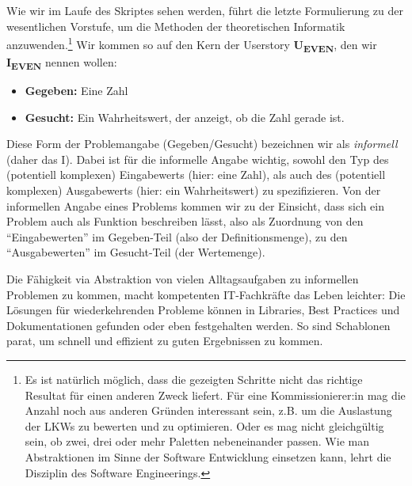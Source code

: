 Wie wir im Laufe des Skriptes sehen werden,
führt die letzte Formulierung zu der wesentlichen Vorstufe,
um die Methoden der theoretischen Informatik anzuwenden.\footnote{
Es ist natürlich möglich,
dass die gezeigten Schritte nicht das richtige Resultat für einen anderen Zweck liefert.
Für eine Kommissionierer:in mag die Anzahl noch aus anderen Gründen interessant sein,
z.B. um die Auslastung der LKWs zu bewerten und zu optimieren.
Oder es mag nicht gleichgültig sein, ob zwei, drei oder mehr Paletten nebeneinander passen.
Wie man Abstraktionen im Sinne der Software Entwicklung einsetzen kann,
lehrt die Disziplin des Software Engineerings.}
Wir kommen so auf den Kern der Userstory \textbf{U\textsubscript{EVEN}},
den wir \textbf{I\textsubscript{EVEN}} nennen wollen:
\begin{itemize}
    \item \textbf{Gegeben:} Eine Zahl
    \item \textbf{Gesucht:} Ein Wahrheitswert, der anzeigt, ob die Zahl gerade ist. 
\end{itemize}
Diese Form der Problemangabe (Gegeben/Gesucht) bezeichnen wir als \emph{informell}
(daher das I).
Dabei ist für die informelle Angabe wichtig,
sowohl den Typ des (potentiell komplexen) Eingabewerts (hier: eine Zahl),
als auch des (potentiell komplexen) Ausgabewerts (hier: ein Wahrheitswert) zu spezifizieren.
Von der informellen Angabe eines Problems kommen wir zu der Einsicht,
dass sich ein Problem auch als Funktion beschreiben lässt,
also als Zuordnung von den ``Eingabewerten'' im Gegeben-Teil
(also der Definitionsmenge),
zu den ``Ausgabewerten'' im Gesucht-Teil
(der Wertemenge).

Die Fähigkeit via Abstraktion von vielen Alltagsaufgaben zu informellen Problemen zu kommen,
macht kompetenten IT-Fachkräfte das Leben leichter:
Die Lösungen für wiederkehrenden Probleme können
in Libraries, Best Practices und Dokumentationen gefunden oder eben festgehalten werden.
So sind Schablonen parat,
um schnell und effizient zu guten Ergebnissen zu kommen.

